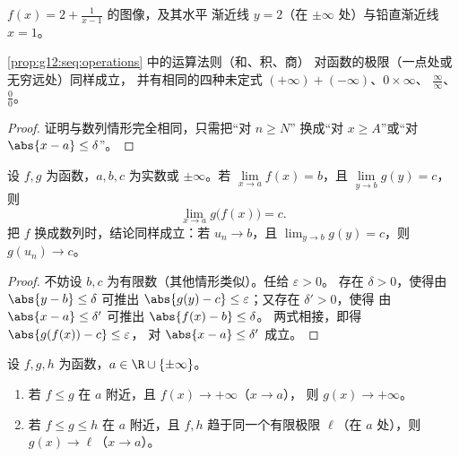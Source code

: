 \begin{omfigure}

{\small $f(x) = 2 + \frac{1}{x-1}$ 的图像，及其水平
渐近线 $y = 2$（在 $\pm\infty$ 处）与铅直渐近线 $x = 1$。}
\end{omfigure}

\begin{proposition}[极限的运算]\label{prop:g12:limcont:operations}
\cref{prop:g12:seq:operations} 中的运算法则（和、积、商）
对函数的极限（一点处或无穷远处）同样成立，
并有相同的四种未定式 $(+\infty)+(-\infty)$、$0\times\infty$、
$\frac{\infty}{\infty}$、$\frac{0}{0}$。
\end{proposition}

\begin{proof}
证明与数列情形完全相同，只需把“对 $n \geq N$”
换成“对 $x \geq A$”或“对 $\abs{x-a} \leq \delta$”。
\end{proof}

\begin{theorem}[复合函数的极限]\label{thm:g12:limcont:composition}
设 $f, g$ 为函数，$a, b, c$ 为实数或 $\pm\infty$。若
$\lim\limits_{x \to a} f(x) = b$，且 $\lim\limits_{y \to b} g(y) = c$，则
\[
\lim_{x \to a} g\bigl(f(x)\bigr) = c .
\]
把 $f$ 换成数列时，结论同样成立：若
$u_n \to b$，且 $\lim_{y\to b} g(y) = c$，则 $g(u_n) \to c$。
\end{theorem}

\begin{proof}
不妨设 $b, c$ 为有限数（其他情形类似）。任给 $\varepsilon > 0$。
存在 $\delta > 0$，使得由 $\abs{y - b} \leq \delta$ 可推出
$\abs{g(y) - c} \leq \varepsilon$；又存在 $\delta' > 0$，使得
由 $\abs{x - a} \leq \delta'$ 可推出 $\abs{f(x) - b} \leq \delta$。
两式相接，即得 $\abs{g(f(x)) - c} \leq \varepsilon$，
对 $\abs{x - a} \leq \delta'$ 成立。
\end{proof}

\begin{theorem}[比较与夹逼]\label{thm:g12:limcont:squeeze}
设 $f, g, h$ 为函数，$a \in \R \cup \{\pm\infty\}$。
\begin{enumerate}
  \item 若 $f \leq g$ 在 $a$ 附近，且 $f(x) \to +\infty$（$x \to a$），
        则 $g(x) \to +\infty$。
  \item 若 $f \leq g \leq h$ 在 $a$ 附近，且 $f, h$ 趋于同一个有限极限
        $\ell$（在 $a$ 处），则 $g(x) \to \ell$（$x \to a$）。
\end{enumerate}
\end{theorem}

